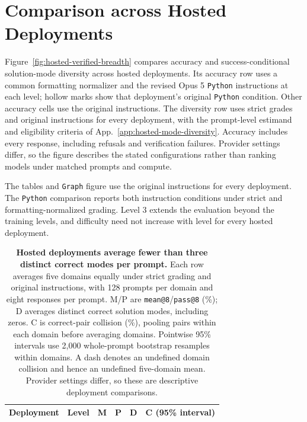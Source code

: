 \section{Comparison across Hosted Deployments}
\label{app:hosted-comparison}

Figure~\ref{fig:hosted-verified-breadth} compares accuracy and success-conditional
solution-mode diversity across hosted deployments. Its accuracy row uses a
common formatting normalizer and the revised Opus 5 \texttt{Python} instructions at
each level; hollow marks show that deployment's original \texttt{Python} condition.
Other accuracy cells use the original instructions. The diversity row uses
strict grades and original instructions for every deployment, with the
prompt-level estimand and eligibility criteria of App.~\ref{app:hosted-mode-diversity}.
Accuracy includes every response, including refusals and verification failures.
Provider settings differ, so the figure describes the stated configurations
rather than ranking models under matched prompts and compute.

The tables and \texttt{Graph} figure use the original instructions for every deployment.
The \texttt{Python} comparison reports both instruction conditions under strict and
formatting-normalized grading. Level 3 extends the evaluation beyond the
training levels, and difficulty need not increase with level for every hosted deployment.











\begin{table}[!htbp]
  \centering
  \caption{\textbf{Hosted deployments average fewer than three distinct correct modes per prompt.}
  Each row averages five domains equally under strict grading and original
  instructions, with 128 prompts per domain and eight responses per prompt.
  M/P are \texttt{mean@8}/\texttt{pass@8} (\%); D averages distinct correct
  solution modes, including zeros. C is correct-pair collision (\%), pooling
  pairs within each domain before averaging domains. Pointwise 95\% intervals
  use 2,000 whole-prompt bootstrap resamples within domains. A dash denotes
  an undefined domain collision and hence an undefined five-domain mean.
  Provider settings differ, so these are descriptive deployment comparisons.}
  \small
  \setlength{\tabcolsep}{3pt}
  \begin{tabular}{@{}lrrrrr@{}}
    \toprule
    Deployment & Level & M & P & D & C (95\% interval) \\
    \midrule
    
  \end{tabular}
\end{table}




